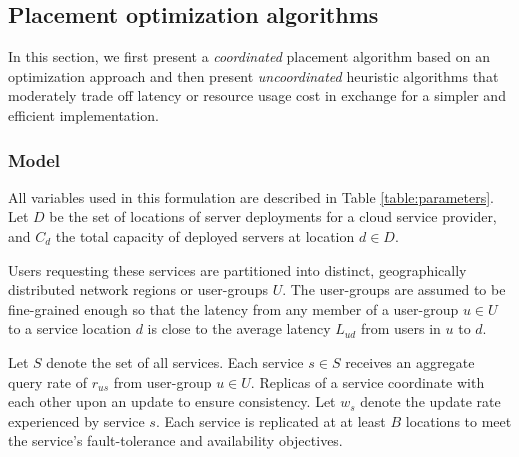 \subsection{Placement optimization algorithms}

In this section, we first present a {\em coordinated} placement algorithm based on an optimization approach and then present {\em uncoordinated} heuristic algorithms that moderately trade off latency or resource usage cost in exchange for a simpler and efficient implementation.

\subsubsection{Model}

All variables used in this formulation are described in Table \ref{table:parameters}. Let $D$ be the set of locations of server deployments for a cloud service provider, and $C_d$ the total capacity of deployed servers at location $d \in D$.


Users requesting these services are partitioned into distinct, geographically distributed network regions or user-groups $U$. The user-groups are assumed to be fine-grained enough so that the latency from any member of a user-group $u\in U$ to a service location $d$ is close to the average latency $L_{ud}$ from users in $u$ to $d$.



Let $S$ denote the set of all services. Each service $s \in S$ receives an aggregate query rate of  $r_{us}$ from user-group $u \in U$. Replicas of a service coordinate with each other upon an update to ensure consistency. Let $w_s$ denote the update rate experienced by service $s$. Each service is replicated at at least $B$ locations to meet the service's fault-tolerance and availability objectives.

